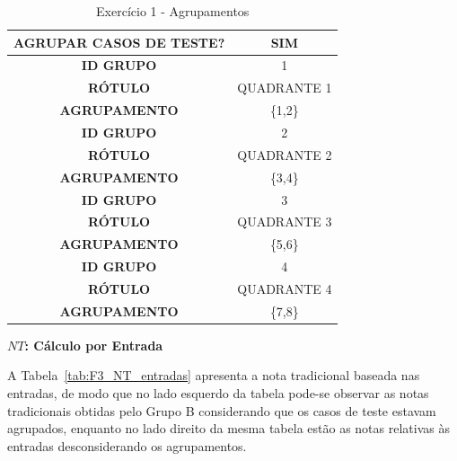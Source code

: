\begin{table}[htbp]
	\centering
	\caption{Exercício 1 - Agrupamentos}
	\begin{tabular}{|c|c|}
		\hline
		\cellcolor[HTML]{C0C0C0}\textbf{AGRUPAR CASOS DE TESTE?} & SIM \\ \hline
		\cellcolor[HTML]{DEDEDE}\textbf{ID GRUPO} & \cellcolor[HTML]{DEDEDE}1\\ \hline
		\textbf{RÓTULO} & QUADRANTE 1 \\ \hline
		\textbf{AGRUPAMENTO} & \{1,2\}\\ \hline
		\cellcolor[HTML]{DEDEDE}\textbf{ID GRUPO} & \cellcolor[HTML]{DEDEDE}2\\ \hline
		\textbf{RÓTULO} & QUADRANTE 2 \\ \hline
		\textbf{AGRUPAMENTO} & \{3,4\}\\ \hline
		\cellcolor[HTML]{DEDEDE}\textbf{ID GRUPO} & \cellcolor[HTML]{DEDEDE}3\\ \hline
		\textbf{RÓTULO} & QUADRANTE 3 \\ \hline
		\textbf{AGRUPAMENTO} & \{5,6\}\\ \hline
		\cellcolor[HTML]{DEDEDE}\textbf{ID GRUPO} & \cellcolor[HTML]{DEDEDE}4\\ \hline
		\textbf{RÓTULO} & QUADRANTE 4 \\ \hline
		\textbf{AGRUPAMENTO} & \{7,8\}\\ \hline	
	\end{tabular}
	\label{tab:F3_Agrupamentos}
\end{table}

\textbf{$NT$: Cálculo por Entrada}

A Tabela~\ref{tab:F3_NT_entradas} apresenta a nota tradicional baseada nas entradas, de modo que no lado esquerdo da tabela pode-se observar as notas tradicionais obtidas pelo Grupo B considerando que os casos de teste estavam agrupados, enquanto no lado direito da mesma tabela estão as notas relativas às entradas desconsiderando os agrupamentos. 

